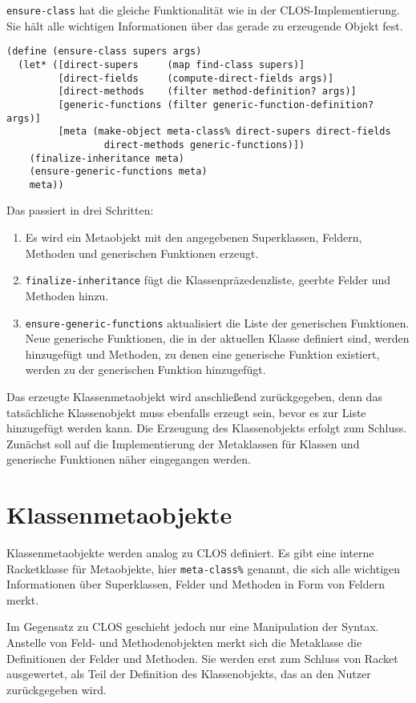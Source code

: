 \texttt{ensure-class} hat die gleiche Funktionalität wie in der CLOS-Implementierung. Sie hält alle wichtigen Informationen über das gerade zu erzeugende Objekt fest. 

\begin{lstlisting}
(define (ensure-class supers args)
  (let* ([direct-supers     (map find-class supers)]  
         [direct-fields     (compute-direct-fields args)]
         [direct-methods    (filter method-definition? args)]
         [generic-functions (filter generic-function-definition? args)]
         [meta (make-object meta-class% direct-supers direct-fields
                 direct-methods generic-functions)])
    (finalize-inheritance meta)
    (ensure-generic-functions meta)
    meta))
\end{lstlisting}


Das passiert in drei Schritten:
\begin{enumerate}
 \item Es wird ein Metaobjekt mit den angegebenen Superklassen, Feldern, Methoden und generischen Funktionen erzeugt.
 \item \texttt{finalize-inheritance} fügt die Klassenpräzedenzliste, geerbte Felder und Methoden hinzu.
 \item \texttt{ensure-generic-functions} aktualisiert die Liste der generischen Funktionen. Neue generische Funktionen, die in der aktuellen Klasse definiert sind, werden hinzugefügt und Methoden, zu denen eine generische Funktion existiert, werden zu der generischen Funktion hinzugefügt.
\end{enumerate}

Das erzeugte Klassenmetaobjekt wird anschließend zurückgegeben, denn das tatsächliche Klassenobjekt muss ebenfalls erzeugt sein, bevor es zur Liste hinzugefügt werden kann. Die Erzeugung des Klassenobjekts erfolgt zum Schluss. Zunächst soll auf die Implementierung der Metaklassen für Klassen und generische Funktionen näher eingegangen werden.

\section{Klassenmetaobjekte}
Klassenmetaobjekte werden analog zu CLOS definiert. Es gibt eine interne Racketklasse für Metaobjekte, hier \texttt{meta-class\%} genannt, die sich alle wichtigen Informationen über Superklassen, Felder und Methoden in Form von Feldern merkt.

Im Gegensatz zu CLOS geschieht jedoch nur eine Manipulation der Syntax. Anstelle von Feld- und Methodenobjekten merkt sich die Metaklasse die Definitionen der Felder und Methoden. Sie werden erst zum Schluss von Racket ausgewertet, als Teil der Definition des Klassenobjekts, das an den Nutzer zurückgegeben wird.

